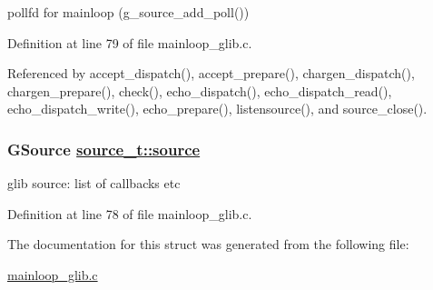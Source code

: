 pollfd for mainloop (g\_\-source\_\-add\_\-poll()) 



Definition at line 79 of file mainloop\_\-glib.c.

Referenced by accept\_\-dispatch(), accept\_\-prepare(), chargen\_\-dispatch(), chargen\_\-prepare(), check(), echo\_\-dispatch(), echo\_\-dispatch\_\-read(), echo\_\-dispatch\_\-write(), echo\_\-prepare(), listensource(), and source\_\-close().\hypertarget{structsource__t_o0}{
\subsubsection[source]{\setlength{\rightskip}{0pt plus 5cm}GSource \hyperlink{structsource__t_o0}{source\_\-t::source}}}
\label{structsource__t_o0}


glib source: list of callbacks etc 



Definition at line 78 of file mainloop\_\-glib.c.

The documentation for this struct was generated from the following file:\begin{CompactItemize}
\item 
\hyperlink{mainloop__glib_8c}{mainloop\_\-glib.c}\end{CompactItemize}
